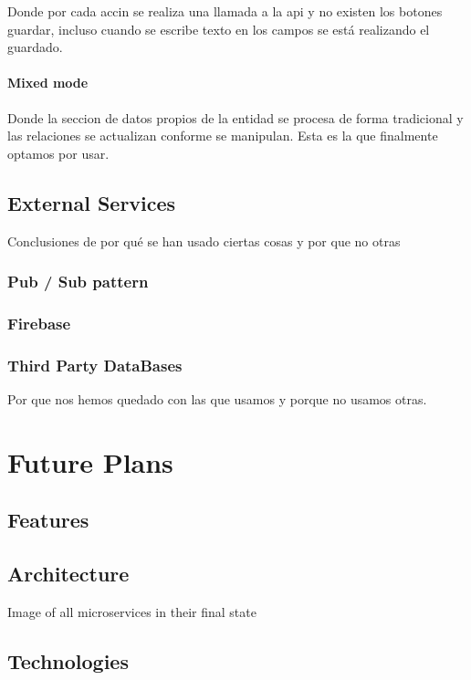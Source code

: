 \documentclass[oneside,english,titlepage]{scrbook}
\begin{document}
Donde por cada accin se realiza una llamada a la api y no existen
los botones guardar, incluso cuando se escribe texto en los campos
se está realizando el guardado.

\subsubsection{Mixed mode}

Donde la seccion de datos propios de la entidad se procesa de forma
tradicional y las relaciones se actualizan conforme se manipulan.
Esta es la que finalmente optamos por usar.

\section{External Services}

Conclusiones de por qué se han usado ciertas cosas y por que no otras

\subsection{Pub / Sub pattern}

\subsection{Firebase}

\subsection{Third Party DataBases}

Por que nos hemos quedado con las que usamos y porque no usamos otras.

\chapter{Future Plans}

\section{Features}

\section{Architecture}

Image of all microservices in their final state

\section{Technologies}
\end{document}
